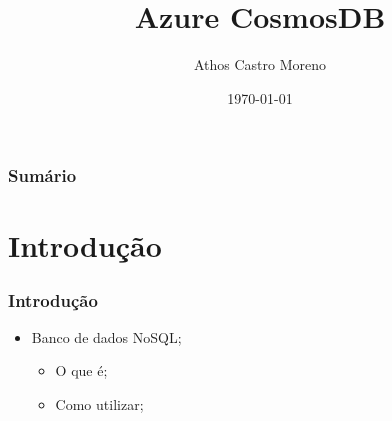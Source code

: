\documentclass{beamer}
\title{Azure CosmosDB}
\author[Athos Castro Moreno]{Athos Castro Moreno}
\institute{Universidade Tecnológica Federal do Paraná}
\date{\today}
\begin{document}
    \begin{frame}
        \titlepage
    \end{frame}
    \begin{frame}
        \frametitle{Sumário}
        \tableofcontents
    \end{frame}
    \section{Introdução}
    \begin{frame}
        \frametitle{Introdução}
        \begin{itemize}
             \item Banco de dados NoSQL;
             \begin{itemize}
                 \item O que é;
                 \item Como utilizar;
             \end{itemize}
        \end{itemize}
    \end{frame}
\end{document}
